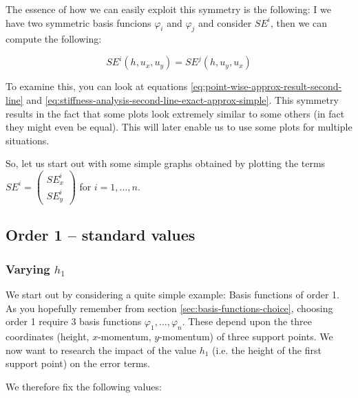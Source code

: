 \documentclass{article}
\renewcommand{\phi}{\varphi}
\begin{document}
The essence of how we can easily exploit this symmetry is the following: I we have two symmetric basis funcions $\phi_i$ and $\phi_j$ and consider $SE^i$, then we can compute the following:

\begin{equation*}
  SE^i(h, u_x, u_y) = SE^j(h, u_y, u_x)
\end{equation*}

To examine this, you can look at equations \eqref{eq:point-wise-approx-result-second-line} and \eqref{eq:stiffness-analysis-second-line-exact-approx-simple}. This symmetry results in the fact that some plots look extremely similar to some others (in fact they might even be equal). This will later enable us to use some plots for multiple situations.


So, let us start out with some simple graphs obtained by plotting the terms $SE^i =
\begin{pmatrix}
  SE_x^i \\ SE_y^i
\end{pmatrix}$ for $i=1,\dots, n$.

\subsection{Order 1 -- standard values}

\subsubsection{Varying $h_1$}

We start out by considering a quite simple example: Basis functions of order 1. As you hopefully remember from section \ref{sec:basis-functions-choice}, choosing order 1 require 3 basis functions $\phi_1,\dots,\phi_n$. These depend upon the three coordinates (height, $x$-momentum, $y$-momentum) of three support points. We now want to research the impact of the value $h_1$ (i.e. the height of the first support point) on the error terms.

We therefore fix the following values:
\end{document}
